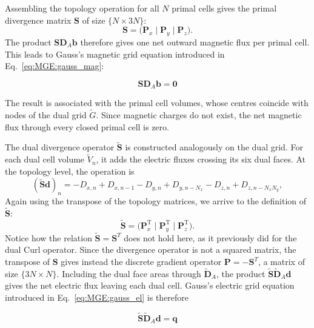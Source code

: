 Assembling the topology operation for all $N$ primal cells gives the primal divergence matrix $\mathbf{S}$ of size $\{N\times 3N\}$:
%
\begin{equation}
\mathbf{S}
=
\bigl(
\mathbf{P}_x
\;\big|\;
\mathbf{P}_y
\;\big|\;
\mathbf{P}_z
\bigr).
\label{eq:S_matrix}
\end{equation}
%
The product $\mathbf{S}\mathbf{D}_A\mathbf b$ therefore gives one net outward magnetic flux per primal cell. This leads to Gauss's magnetic grid equation introduced in Eq.~\eqref{eq:MGE:gauss_mag}:

\begin{equation}
\boxed{
\mathbf{S}\mathbf{D}_A\mathbf{b}
=
\mathbf{0}
}
\label{eq:MGE:gauss_mag_final}
\end{equation}

The result is associated with the primal cell volumes, whose centres coincide with nodes of the dual grid $\widetilde{G}$. Since magnetic charges do not exist, the net magnetic flux through every closed primal cell is zero.

The dual divergence operator $\widetilde{\mathbf{S}}$ is constructed analogously on the dual grid. For each dual cell volume $\widetilde V_n$, it adds the electric fluxes crossing its six dual faces. At the topology level, the operation is
%
\begin{equation}
(\widetilde{\mathbf{S}}\mathbf{d})_{n} = -D_{x,n}+D_{x,n-1} -D_{y,n}+D_{y,n-N_x} -D_{z,n}+D_{z,n-N_xN_y},
\end{equation}
%
Again using the transpose of the topology matrices, we arrive to the definition of $\widetilde{\mathbf{S}}$:
%
\begin{equation}
\widetilde{\mathbf{S}}
=
\bigl(
\mathbf{P}_x^{\mathrm{T}}
\;\big|\;
\mathbf{P}_y^{\mathrm{T}}
\;\big|\;
\mathbf{P}_z^{\mathrm{T}}
\bigr).
\end{equation}
%
Notice how the relation $\widetilde{\mathbf{S}} = \mathbf{S}^T$ does not hold here, as it previously did for the dual Curl operator. Since the divergence operator is not a squared matrix, the transpose of $\mathbf{S}$ gives instead the discrete gradient operator $\mathbf{P}=-\mathbf{S}^T$, a matrix of size $\{3N\times N\}$. Including the dual face areas through $\widetilde{\mathbf{D}}_A$, the product $\widetilde{\mathbf{S}}\widetilde{\mathbf{D}}_A\mathbf d$ gives the net electric flux leaving each dual cell. Gauss's electric grid equation introduced in Eq.~\eqref{eq:MGE:gauss_el} is therefore

\begin{equation}
\boxed{
\widetilde{\mathbf{S}}
\widetilde{\mathbf{D}}_A\mathbf{d}
=
\mathbf{q}
}
\label{eq:MGE:gauss_el_final}
\end{equation}

